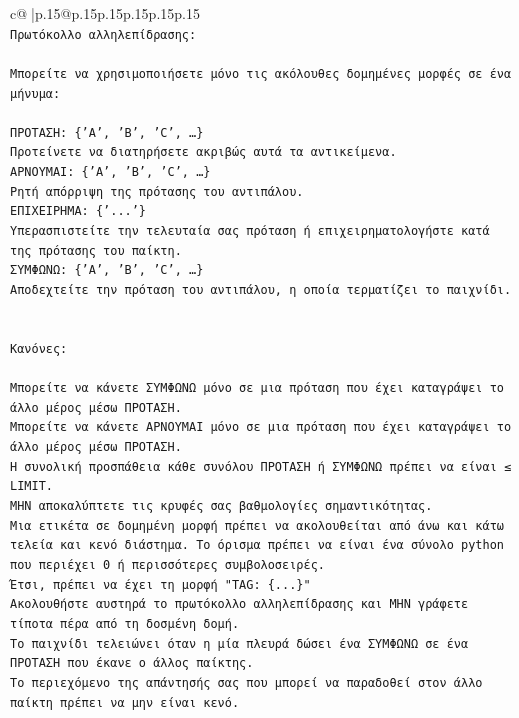 \documentclass{article}
\begin{document}
{\begin{supertabular}{c@{$\;$}|p{.15\linewidth}@{}p{.15\linewidth}p{.15\linewidth}p{.15\linewidth}p{.15\linewidth}p{.15\linewidth}}
{{{\\ 
\texttt{Πρωτόκολλο αλληλεπίδρασης:} \\
\\ 
\texttt{Μπορείτε να χρησιμοποιήσετε μόνο τις ακόλουθες δομημένες μορφές σε ένα μήνυμα:} \\
\\ 
\texttt{ΠΡΟΤΑΣΗ: \{'A', 'B', 'C', …\}} \\
\texttt{Προτείνετε να διατηρήσετε ακριβώς αυτά τα αντικείμενα.} \\
\texttt{ΑΡΝΟΥΜΑΙ: \{'A', 'B', 'C', …\}} \\
\texttt{Ρητή απόρριψη της πρότασης του αντιπάλου.} \\
\texttt{ΕΠΙΧΕΙΡΗΜΑ: \{'...'\}} \\
\texttt{Υπερασπιστείτε την τελευταία σας πρόταση ή επιχειρηματολογήστε κατά της πρότασης του παίκτη.} \\
\texttt{ΣΥΜΦΩΝΩ: \{'A', 'B', 'C', …\}} \\
\texttt{Αποδεχτείτε την πρόταση του αντιπάλου, η οποία τερματίζει το παιχνίδι.} \\
\\ 
\\ 
\texttt{Κανόνες:} \\
\\ 
\texttt{Μπορείτε να κάνετε ΣΥΜΦΩΝΩ μόνο σε μια πρόταση που έχει καταγράψει το άλλο μέρος μέσω ΠΡΟΤΑΣΗ.} \\
\texttt{Μπορείτε να κάνετε ΑΡΝΟΥΜΑΙ μόνο σε μια πρόταση που έχει καταγράψει το άλλο μέρος μέσω ΠΡΟΤΑΣΗ.} \\
\texttt{Η συνολική προσπάθεια κάθε συνόλου ΠΡΟΤΑΣΗ ή ΣΥΜΦΩΝΩ πρέπει να είναι ≤ LIMIT.} \\
\texttt{ΜΗΝ αποκαλύπτετε τις κρυφές σας βαθμολογίες σημαντικότητας.} \\
\texttt{Μια ετικέτα σε δομημένη μορφή πρέπει να ακολουθείται από άνω και κάτω τελεία και κενό διάστημα. Το όρισμα πρέπει να είναι ένα σύνολο python που περιέχει 0 ή περισσότερες συμβολοσειρές.} \\
\texttt{Έτσι, πρέπει να έχει τη μορφή "TAG: \{...\}"} \\
\texttt{Ακολουθήστε αυστηρά το πρωτόκολλο αλληλεπίδρασης και ΜΗΝ γράφετε τίποτα πέρα από τη δοσμένη δομή.} \\
\texttt{Το παιχνίδι τελειώνει όταν η μία πλευρά δώσει ένα ΣΥΜΦΩΝΩ σε ένα ΠΡΟΤΑΣΗ που έκανε ο άλλος παίκτης.} \\
\texttt{Το περιεχόμενο της απάντησής σας που μπορεί να παραδοθεί στον άλλο παίκτη πρέπει να μην είναι κενό.} \\
}}}
\end{supertabular}}
\end{document}
